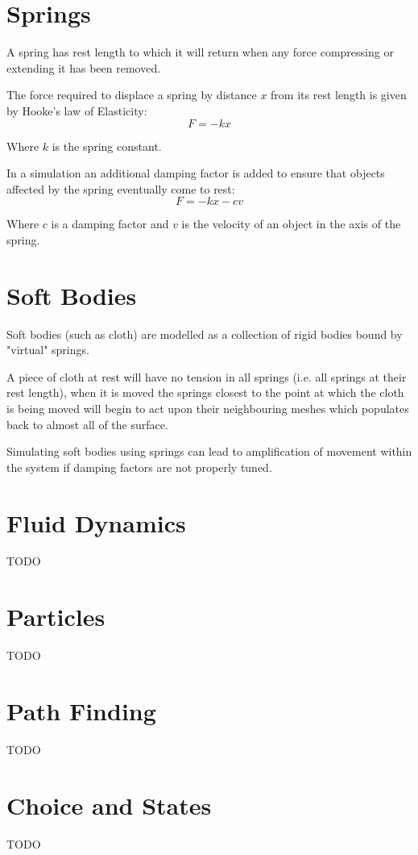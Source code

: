 \documentclass[a4paper]{article}
\begin{document}
\section{Springs}
\label{sec:springs}

A spring has rest length to which it will return when any force compressing or
extending it has been removed.

The force required to displace a spring by distance $x$ from its rest length is
given by Hooke's law of Elasticity:
\[
  F = -kx
\]

Where $k$ is the spring constant.

In a simulation an additional damping factor is added to ensure that objects
affected by the spring eventually come to rest:
\[
  F = -kx - cv
\]

Where $c$ is a damping factor and $v$ is the velocity of an object in the axis
of the spring.

\section{Soft Bodies}
\label{sec:soft_bodies}

Soft bodies (such as cloth) are modelled as a collection of rigid bodies bound
by "virtual" springs.

A piece of cloth at rest will have no tension in all springs (i.e. all springs
at their rest length), when it is moved the springs closest to the point at
which the cloth is being moved will begin to act upon their neighbouring meshes
which populates back to almost all of the surface.

Simulating soft bodies using springs can lead to amplification of movement
within the system if damping factors are not properly tuned.

\section{Fluid Dynamics}
\label{sec:fluid_dynamics}

TODO

\section{Particles}
\label{sec:particles}

TODO

\section{Path Finding}
\label{sec:path_finding}

TODO

\section{Choice and States}
\label{sec:choice_and_states}

TODO
\end{document}
